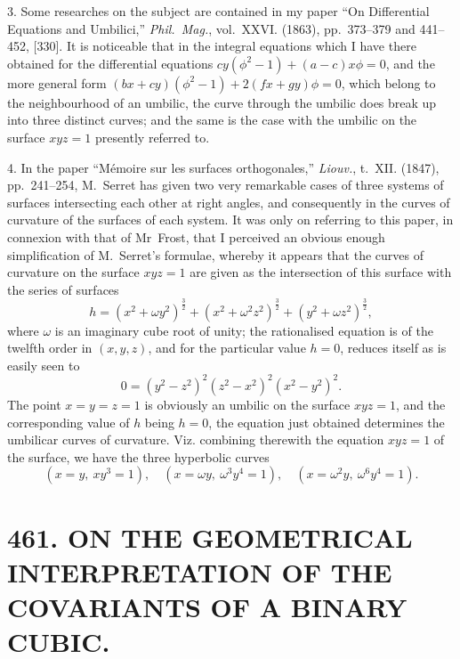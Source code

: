 \documentclass[11pt,a4paper]{article}
\newcommand{\article}[2]{\section*{#1. #2}}
\begin{document}
3. Some researches on the subject are contained in my paper ``On Differential Equations and Umbilici,'' \textit{Phil.\ Mag.}, vol.~XXVI. (1863), pp.~373--379 and 441--452, [330]. It is noticeable that in the integral equations which I have there obtained for the differential equations $cy(\phi^{2}-1)+(a-c)x\phi=0$, and the more general form $(bx+cy)(\phi^{2}-1)+2(fx+gy)\phi=0$, which belong to the neighbourhood of an umbilic, the curve through the umbilic does break up into three distinct curves; and the same is the case with the umbilic on the surface $xyz=1$ presently referred to.

4. In the paper ``M\'{e}moire sur les surfaces orthogonales,'' \textit{Liouv.}, t.~XII. (1847), pp.~241--254, M.~Serret has given two very remarkable cases of three systems of surfaces intersecting each other at right angles, and consequently in the curves of curvature of the surfaces of each system. It was only on referring to this paper, in connexion with that of Mr~Frost, that I perceived an obvious enough simplification of M.~Serret's formulae, whereby it appears that the curves of curvature on the surface $xyz=1$ are given as the intersection of this surface with the series of surfaces
\[
h = (x^{2}+\omega y^{2})^{\frac{3}{2}} + (x^{2}+\omega^{2}z^{2})^{\frac{3}{2}} + (y^{2}+\omega z^{2})^{\frac{3}{2}},
\]
where $\omega$ is an imaginary cube root of unity; the rationalised equation is of the twelfth order in $(x, y, z)$, and for the particular value $h=0$, reduces itself as is easily seen to
\[
0 = (y^{2}-z^{2})^{2}(z^{2}-x^{2})^{2}(x^{2}-y^{2})^{2}.
\]
The point $x=y=z=1$ is obviously an umbilic on the surface $xyz=1$, and the corresponding value of $h$ being $h=0$, the equation just obtained determines the umbilicar curves of curvature. Viz. combining therewith the equation $xyz=1$ of the surface, we have the three hyperbolic curves
\[
(x=y,\ xy^{3}=1),\quad (x=\omega y,\ \omega^{3}y^{4}=1),\quad (x=\omega^{2}y,\ \omega^{6}y^{4}=1).
\]

\newpage
\setcounter{page}{332}

\article{461}{ON THE GEOMETRICAL INTERPRETATION OF THE COVARIANTS OF A BINARY CUBIC.}


\vspace{0.5em}
\end{document}
